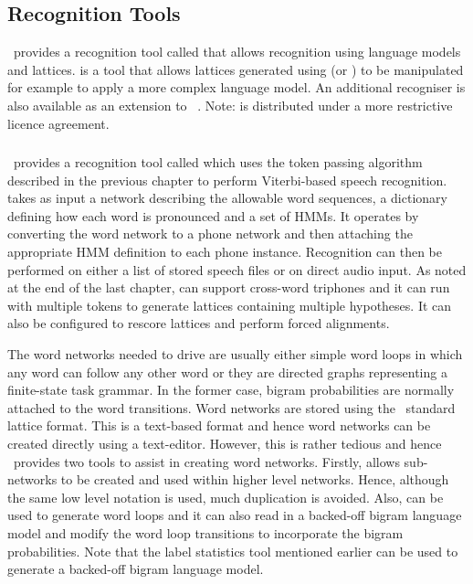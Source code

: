 \subsection{Recognition Tools}

\HTK\ provides a recognition tool called
 that allows recognition
using language models and lattices. 
 is a tool that allows
lattices generated using  (or ) to
be manipulated for example to apply a more complex language model.
An additional recogniser is also available as an extension to \HTK\,
. Note:  is
distributed under a more restrictive licence agreement.

\subsubsection{}
\HTK\ provides a recognition 
tool called 
which uses the token passing algorithm described in the previous
chapter to perform Viterbi-based speech recognition.  
takes as input a network describing the allowable word sequences,
a dictionary defining how each word is pronounced and a set of HMMs.
It operates by converting the word network to a phone network and
then attaching the appropriate HMM definition to each phone instance.
Recognition can then be performed on either a list of stored speech
files or on direct audio input.  As noted at the end of the last
chapter,  can support cross-word triphones and it can
run with multiple tokens to generate
lattices containing multiple hypotheses.  It can also be configured
to rescore lattices and perform forced alignments.

The word networks needed to drive  are usually either
simple word loops in which any word can follow any other word or they
are directed graphs representing a finite-state task grammar.  In the
former case, bigram probabilities are normally attached to the word
transitions.  Word networks are stored using
the \HTK\ standard lattice format.  
This is a text-based format and
hence word networks can be created directly using a text-editor.
However, this is rather tedious and hence \HTK\ provides two
tools to assist in creating word networks.  Firstly,  
allows sub-networks to be created and used within higher level networks.
Hence, although the same low level notation is used, much duplication
is avoided.  Also,  can be used to generate word loops
and it can also read in a backed-off bigram language model and 
modify the word loop transitions to incorporate the bigram probabilities.
Note that the label statistics tool  mentioned earlier
can be used to generate a backed-off bigram language model.

